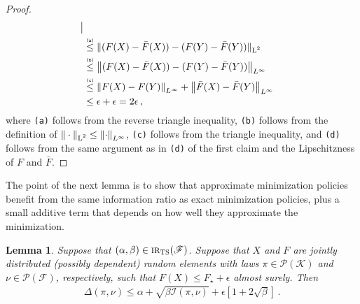 \documentclass[letter, 12pt]{report}
\newcommand{\explan}[1]{\stackrel{\text{\tiny \texttt{#1}}}}
\newcommand{\norm}[1]{\left \Vert  #1 \right \Vert}
\newcommand{\Lsnorm}[1]{ \Vert  #1 \Vert_{\text{\scriptsize \textrm{L}$^2$}}}
\newcommand{\cK}{\mathcal K}
\newcommand{\sF}{\mathscr F}
\newcommand{\cI}{\mathcal I}
\newcommand{\sP}{\mathscr P}
\newcommand{\1}{\mathbf{1}}
\newcommand{\IR}{\operatorname{\textsc{ir}}}
\newcommand{\ts}{\textsc{TS}\xspace}
\theoremstyle{plain}
\newtheorem{lemma}[theorem]{Lemma}
\theoremstyle{definition}
\theoremstyle{remark}
\begin{document}
\begin{proof}
\begin{align*}
        \big|
        \\
         &
        \explan{(a)}
        \leq
        \Lsnorm{(F(X) - \bar{F}(X)) - (F(Y) - \bar{F}(Y))}                        \\
         &
        \explan{(b)}
        \leq
        \norm{(F(X) - \bar{F}(X)) - (F(Y) - \bar{F}(Y))}_{L^\infty}               \\
         &
        \explan{(c)}
        \leq
        \norm{F(X) - F(Y)}_{L^\infty} + \norm{\bar{F}(X) - \bar{F}(Y)}_{L^\infty} \\
         & \leq
        \epsilon + \epsilon
        = 2\epsilon \,,
    \end{align*}
    where \texttt{(a)} follows from the reverse triangle inequality,
    \texttt{(b)} follows from the definition of $\Lsnorm{\cdot} \leq \norm{\cdot}_{L^\infty}$,
    \texttt{(c)} follows from the triangle inequality, and
    \texttt{(d)}
    follows from the same argument as in \texttt{(d)} of the first claim and the Lipschitzness of $F$ and $\bar F$.
\end{proof}

The point of the next lemma is to show that approximate minimization policies benefit from the same information ratio as exact minimization policies, plus a small additive term that depends on how well they approximate the minimization.
\begin{lemma}\label{lem:ts-eps}
    Suppose that $(\alpha, \beta) \in \IR_\ts(\sF)$.
    Suppose that $X$ and $F$ are jointly distributed (possibly dependent) random elements with laws $\pi \in \sP(\cK)$ and $\nu \in \sP(\sF)$, respectively, such that
    $F(X) \leq F_\star + \epsilon$ almost surely. Then
    \begin{align*}
        \Delta(\pi, \nu) \leq \alpha + \sqrt{\beta \cI(\pi, \nu)} + \epsilon\left[1 + 2\sqrt{\beta}\right]\,.
    \end{align*}
\end{lemma}
\end{document}
